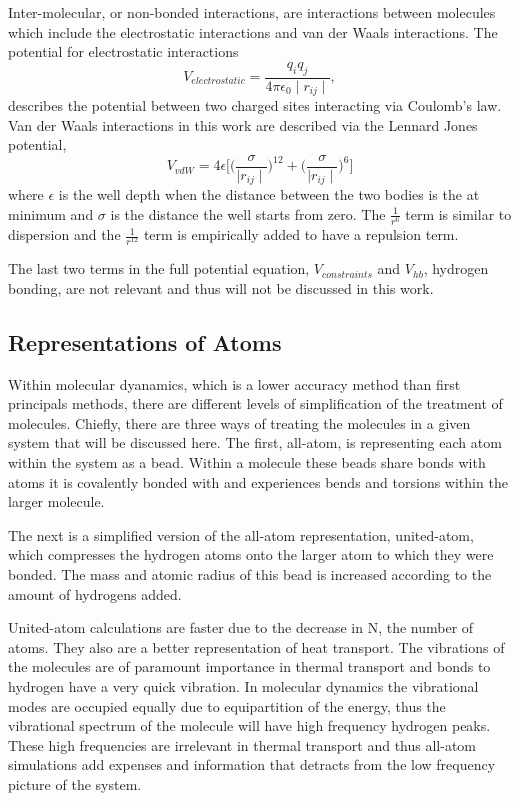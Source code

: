 Inter-molecular,  or non-bonded interactions, are interactions between molecules which include the electrostatic interactions and van der Waals interactions.
The potential for electrostatic interactions
\begin{equation}
    V_{electrostatic} = \frac{q_i q_j}{4 \pi \epsilon_0 \mid r_{ij}\mid},
\end{equation}
describes the potential between two charged sites interacting via Coulomb's law.
Van der Waals interactions in this work are described via the Lennard Jones potential,
\begin{equation}
    V_{vdW} = 4\epsilon\bigg[\bigg(\frac{\sigma}{\mid r_{ij}\mid}\bigg)^{12} + \bigg(\frac{\sigma}{\mid r_{ij}\mid}\bigg)^6\big]
\end{equation}
where $\epsilon$ is the well depth when the distance between the two bodies is the at minimum and $\sigma$ is the distance the well starts from zero. 
The $\frac{1}{r^6}$ term is similar to dispersion and the $\frac{1}{r^{12}}$ term is empirically added to have a repulsion term.

The last two terms in the full potential equation, $V_{constraints}$ and $V_{hb}$, hydrogen bonding, are not relevant and thus will not be discussed in this work.

\subsection{Representations of Atoms}
Within molecular dyanamics, which is a lower accuracy method than first principals methods, there are different levels of simplification of the treatment of molecules.\cite{Leach2001} 
Chiefly, there are three ways of treating the molecules in a given system that will be discussed here. 
The first, all-atom, is representing each atom within the system as a bead. Within a molecule these beads share bonds with atoms it is covalently bonded with and experiences bends and torsions within the larger molecule.

The next is a simplified version of the all-atom representation, united-atom, which compresses the hydrogen atoms onto the larger atom to which they were bonded. The mass and atomic radius of this bead is increased according to the amount of hydrogens added.

United-atom calculations are faster due to the decrease in N, the number of atoms. They also are a better representation of heat transport. The vibrations of the molecules are of paramount importance in thermal transport and bonds to hydrogen have a very quick vibration. In molecular dynamics the vibrational modes are occupied equally due to equipartition of the energy, thus the vibrational spectrum of the molecule will have high frequency hydrogen peaks. These high frequencies are irrelevant in thermal transport and thus all-atom simulations add expenses and information that detracts from the low frequency picture of the system.

